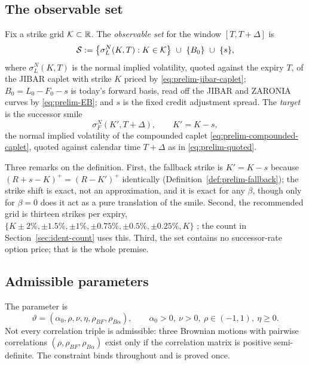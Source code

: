 \documentclass[../../../main.tex]{subfiles}
\begin{document}
\subsection{The observable set}

\begin{definition}\label{def:ident-observable}
Fix a strike grid $\mathcal K\subset\mathbb{R}$. The \emph{observable set} for the window $[T,T+\Delta]$ is
\[
\mathcal S:=\big\{\sigma^N_L(K,T):K\in\mathcal K\big\}\ \cup\ \{B_0\}\ \cup\ \{s\},
\]
where $\sigma^N_L(K,T)$ is the normal implied volatility, quoted against the expiry $T$, of the JIBAR caplet with strike $K$ priced by \eqref{eq:prelim-jibar-caplet}; $B_0=L_0-F_0-s$ is today's forward basis, read off the JIBAR and ZARONIA curves by \eqref{eq:prelim-EB}; and $s$ is the fixed credit adjustment spread. The \emph{target} is the successor smile
\[
\sigma^N_F(K',T+\Delta),\qquad K'=K-s,
\]
the normal implied volatility of the compounded caplet \eqref{eq:prelim-compounded-caplet}, quoted against calendar time $T+\Delta$ as in \eqref{eq:prelim-quoted}.
\end{definition}

Three remarks on the definition. First, the fallback strike is $K'=K-s$ because $(R+s-K)^+=(R-K')^+$ identically (Definition~\ref{def:prelim-fallback}); the strike shift is exact, not an approximation, and it is exact for any $\beta$, though only for $\beta=0$ does it act as a pure translation of the smile. Second, the recommended grid is thirteen strikes per expiry, $\{K\pm2\%,\pm1.5\%,\pm1\%,\pm0.75\%,\pm0.5\%,\pm0.25\%,K\}$ \citep[\S7.6, p.~25]{sarb2024conv}; the count in Section~\ref{sec:ident-count} uses this. Third, the set contains no successor-rate option price; that is the whole premise.

\subsection{Admissible parameters}

The parameter is
\[
\vartheta=(\alpha_0,\rho,\nu,\eta,\rho_{BF},\rho_{B\alpha}),\qquad \alpha_0>0,\ \nu>0,\ \rho\in(-1,1),\ \eta\ge0.
\]
Not every correlation triple is admissible: three Brownian motions with pairwise correlations $(\rho,\rho_{BF},\rho_{B\alpha})$ exist only if the correlation matrix is positive semi-definite. The constraint binds throughout and is proved once.
\end{document}

